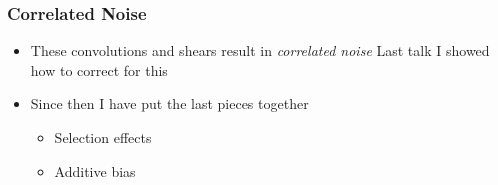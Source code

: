 \documentclass{beamer}
\begin{document}
\frame
{
    \frametitle{Correlated Noise}

 
    \begin{itemize}

        \item These convolutions and shears result in {\em {\color{gold}
            correlated noise}} Last talk I showed how to correct for this

        \item Since then I have put the last pieces together
            \begin{itemize}
                \item Selection effects
                \item Additive bias 
            \end{itemize}

    \end{itemize}

}
\end{document}
